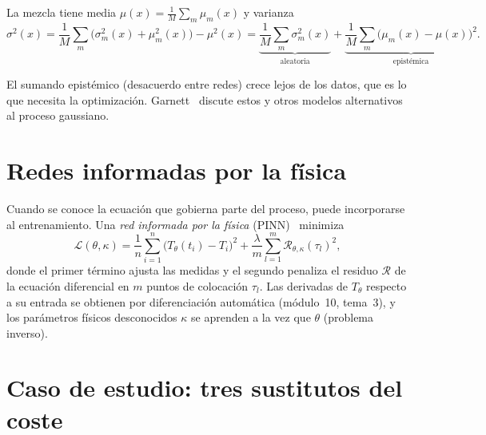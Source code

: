 \begin{proposicion}\label{prop:mezcla}
La mezcla tiene media $\mu(x)=\frac1M\sum_m\mu_m(x)$ y varianza
\[
\sigma^2(x)=\frac1M\sum_m\bigl(\sigma_m^2(x)+\mu_m^2(x)\bigr)-\mu^2(x)=\underbrace{\frac1M\sum_m\sigma_m^2(x)}_{\text{aleatoria}}+\underbrace{\frac1M\sum_m\bigl(\mu_m(x)-\mu(x)\bigr)^2}_{\text{epistémica}} .
\]
\end{proposicion}

El sumando epistémico (desacuerdo entre redes) crece lejos de los datos, que es lo que necesita la optimización. Garnett~\cite[§8.11]{garnett} discute estos y otros modelos alternativos al proceso gaussiano.

\addtocounter{definicion}{1}%

\section{Redes informadas por la física}

Cuando se conoce la ecuación que gobierna parte del proceso, puede incorporarse al entrenamiento. Una \emph{red informada por la física} (PINN)~\cite{raissi} minimiza
\[
\mathcal L(\theta,\kappa)=\frac1{n}\sum_{i=1}^{n}\bigl(T_\theta(t_i)-T_i\bigr)^2+\frac{\lambda}{m}\sum_{l=1}^{m}\mathcal R_{\theta,\kappa}(\tau_l)^2,
\]
donde el primer término ajusta las medidas y el segundo penaliza el residuo $\mathcal R$ de la ecuación diferencial en $m$ puntos de colocación $\tau_l$. Las derivadas de $T_\theta$ respecto a su entrada se obtienen por diferenciación automática (módulo~10, tema~3), y los parámetros físicos desconocidos $\kappa$ se aprenden a la vez que $\theta$ (problema inverso).

\addtocounter{definicion}{1}%

\section{Caso de estudio: tres sustitutos del coste}

\addtocounter{definicion}{1}%

